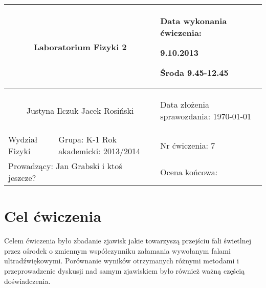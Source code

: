 \documentclass[a4paper,12pt]{article}
\author{Justyna Ilczuk, Jacek Rosiński}
\begin{document}
\begin{center}

    \begin{tabular}{ | m{5cm}| m{5cm} | m{5cm} |}
    \hline 
    \multicolumn{2}{|c|}{{ \Large \textbf{Laboratorium Fizyki 2}} }
    &  
    \begin{center}
    Data wykonania ćwiczenia:
    \end{center}
    \begin{center}
      9.10.2013 
    \end{center}
    \begin{center}
    Środa 9.45-12.45
    \end{center}
     \\ 
    
    \hline
    \multicolumn{2}{|c|}{Justyna Ilczuk \newline Jacek Rosiński}
    & \begin{center}
    {\small Data złożenia sprawozdania:} \newline \today
    \end{center}   \\
   	
   	\hline
    Wydział Fizyki & Grupa: K-1 \newline Rok akademicki: 2013/2014 &    Nr ćwiczenia: 7 \\
   	\hline
   	\multicolumn{2}{|l|}{Prowadzący: Jan Grabski i ktoś jeszcze?} & \multicolumn{1}{|l|}{Ocena końcowa:}\\
    \hline
    \end{tabular}
\end{center}




\section{Cel ćwiczenia}

Celem ćwiczenia było zbadanie zjawisk jakie towarzyszą przejściu fali świetlnej przez ośrodek o zmiennym współczynniku załamania wywołanym falami ultradźwiękowymi. Porównanie wyników otrzymanych różnymi metodami i przeprowadzenie dyskusji nad samym zjawiskiem było również ważną częścią doświadczenia. 

\newpage

\pagestyle{fancy}
\fancyfoot[CO]{\ }
\fancyhead[RO]{\footnotesize{\thepage} }
\end{document}
